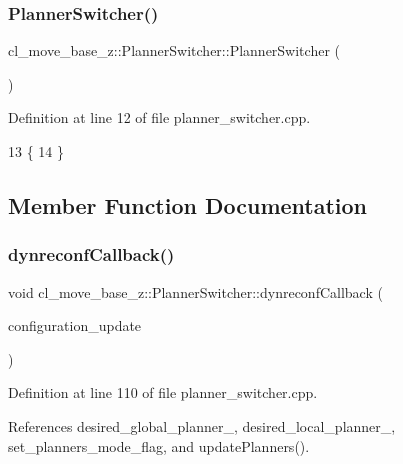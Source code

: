 \subsubsection{\texorpdfstring{Planner\+Switcher()}{PlannerSwitcher()}}
{\footnotesize\ttfamily cl\+\_\+move\+\_\+base\+\_\+z\+::\+Planner\+Switcher\+::\+Planner\+Switcher (\begin{DoxyParamCaption}{ }\end{DoxyParamCaption})}



Definition at line 12 of file planner\+\_\+switcher.\+cpp.


\begin{DoxyCode}
13 \{
14 \}
\end{DoxyCode}


\subsection{Member Function Documentation}
\mbox{\label{classcl__move__base__z_1_1PlannerSwitcher_ad9371bd8d62600ef874e8914c3ec177b}} 
\subsubsection{\texorpdfstring{dynreconf\+Callback()}{dynreconfCallback()}}
{\footnotesize\ttfamily void cl\+\_\+move\+\_\+base\+\_\+z\+::\+Planner\+Switcher\+::dynreconf\+Callback (\begin{DoxyParamCaption}\item[{const dynamic\+\_\+reconfigure\+::\+Config\+::\+Const\+Ptr \&}]{configuration\+\_\+update }\end{DoxyParamCaption})\hspace{0.3cm}{\ttfamily [private]}}



Definition at line 110 of file planner\+\_\+switcher.\+cpp.



References desired\+\_\+global\+\_\+planner\+\_\+, desired\+\_\+local\+\_\+planner\+\_\+, set\+\_\+planners\+\_\+mode\+\_\+flag, and update\+Planners().




